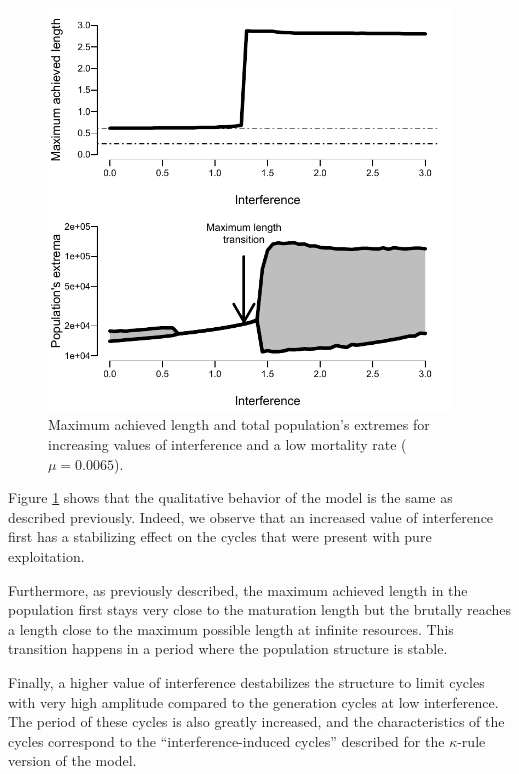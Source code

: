 \begin{figure}[!h] %
\centering
\includegraphics[width=0.95\textwidth]{4_ChapThe1/Fig/FigSM8}
\caption[Bifurcation over interference
(net production model)]{Maximum achieved length and total population's extremes
for increasing values of interference and a low mortality rate ($\mu=0.0065$).}
\label{Fig4-SM8}
\end{figure}

Figure \ref{Fig4-SM8} shows that the qualitative behavior of the model is the
same as described previously. Indeed, we observe that an increased value of interference
first has a stabilizing effect on the cycles that were present with pure
exploitation.

Furthermore, as previously described, the maximum achieved length in the
population first stays very close to the maturation length but the brutally
reaches a length close to the maximum possible length at infinite resources.
This transition happens in a period where the population structure is stable.

Finally, a higher value of interference destabilizes the structure to limit
cycles with very high amplitude compared to the generation cycles at low
interference. The period of these cycles is also greatly increased, and the
characteristics of the cycles correspond to the “interference-induced cycles”
described for the $\kappa$-rule version of the model.

